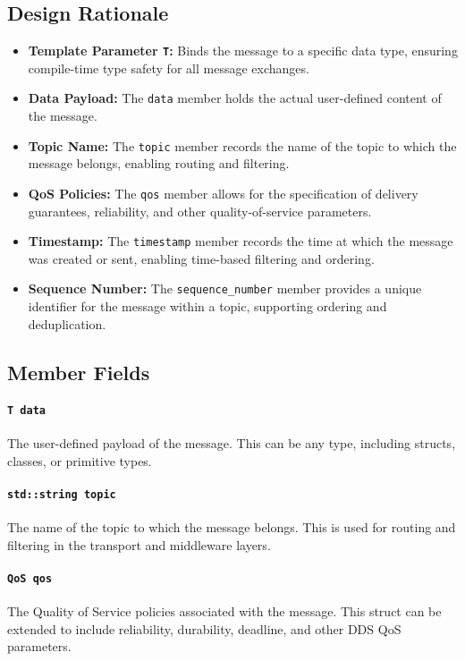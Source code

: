 \documentclass[12pt]{report}
\begin{document}
\subsection{Design Rationale}
\begin{itemize}
    \item \textbf{Template Parameter \texttt{T}:} Binds the message to a specific data type, ensuring compile-time type safety for all message exchanges.
    \item \textbf{Data Payload:} The \texttt{data} member holds the actual user-defined content of the message.
    \item \textbf{Topic Name:} The \texttt{topic} member records the name of the topic to which the message belongs, enabling routing and filtering.
    \item \textbf{QoS Policies:} The \texttt{qos} member allows for the specification of delivery guarantees, reliability, and other quality-of-service parameters.
    \item \textbf{Timestamp:} The \texttt{timestamp} member records the time at which the message was created or sent, enabling time-based filtering and ordering.
    \item \textbf{Sequence Number:} The \texttt{sequence\_number} member provides a unique identifier for the message within a topic, supporting ordering and deduplication.
\end{itemize}

\subsection{Member Fields}
\paragraph{\texttt{T data}}
The user-defined payload of the message. This can be any type, including structs, classes, or primitive types.

\paragraph{\texttt{std::string topic}}
The name of the topic to which the message belongs. This is used for routing and filtering in the transport and middleware layers.

\paragraph{\texttt{QoS qos}}
The Quality of Service policies associated with the message. This struct can be extended to include reliability, durability, deadline, and other DDS QoS parameters.
\end{document}
